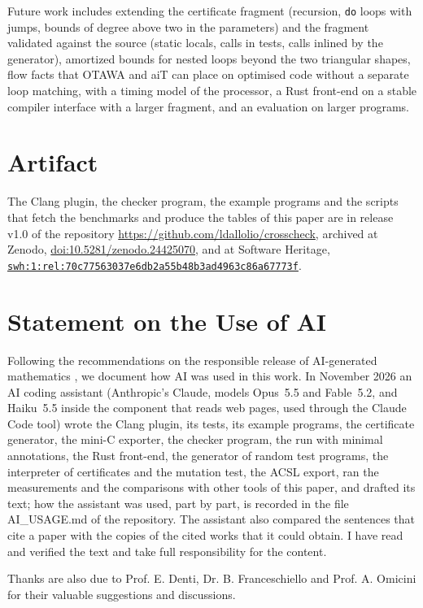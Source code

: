 \documentclass[oneside,english]{amsart}
\numberwithin{equation}{section}
\numberwithin{figure}{section}
\theoremstyle{plain}
\theoremstyle{definition}
\theoremstyle{plain}
\theoremstyle{remark}
\theoremstyle{plain}
\theoremstyle{definition}
\theoremstyle{plain}
\theoremstyle{remark}
\newcommand{\lean}[1]{{\ttfamily\small #1}}
\begin{document}
Future work includes extending the certificate fragment (recursion, \texttt{do} loops with jumps, bounds of degree above two in the parameters) and the fragment validated against the source (static locals, calls in tests, calls inlined by the generator), amortized bounds for nested loops beyond the two triangular shapes, flow facts that OTAWA and aiT can place on optimised code without a separate loop matching, with a timing model of the processor, a Rust front-end on a stable compiler interface with a larger fragment, and an evaluation on larger programs.

\section*{Artifact}

The Clang plugin, the checker program, the example programs and the scripts that fetch the benchmarks and produce the tables of this paper are in release v1.0 of the repository \url{https://github.com/ldallolio/crosscheck}, archived at Zenodo, \href{https://doi.org/10.5281/zenodo.24425070}{doi:10.5281/zenodo.24425070}, and at Software Heritage, \href{https://archive.softwareheritage.org/swh:1:rel:70c77563037e6db2a55b48b3ad4963c86a67773f}{\nolinkurl{swh:1:rel:70c77563037e6db2a55b48b3ad4963c86a67773f}}.

\section*{Statement on the Use of AI}

Following the recommendations on the responsible release of AI-generated mathematics \cite{agmai2026responsible}, we document how AI was used in this work. In November 2026 an AI coding assistant (Anthropic's Claude, models Opus~5.5 and Fable~5.2, and Haiku~5.5 inside the component that reads web pages, used through the Claude Code tool) wrote the Clang plugin, its tests, its example programs, the certificate generator, the mini-C exporter, the checker program, the run with minimal annotations, the Rust front-end, the generator of random test programs, the interpreter of certificates and the mutation test, the ACSL export, ran the measurements and the comparisons with other tools of this paper, and drafted its text; how the assistant was used, part by part, is recorded in the file \lean{AI\_USAGE.md} of the repository. The assistant also compared the sentences that cite a paper with the copies of the cited works that it could obtain. I have read and verified the text and take full responsibility for the content.

Thanks are also due to Prof. E. Denti, Dr. B. Franceschiello and Prof.
A. Omicini for their valuable suggestions and discussions.



\end{document}
